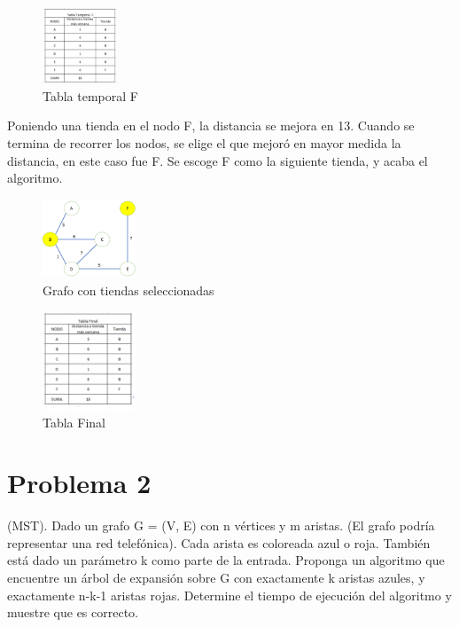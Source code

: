 \documentclass[conference,compsoc]{IEEEtran}
\begin{document}
\begin{figure}[h]
    \centering
    \includegraphics[width=0.20\textwidth]{Problema1/p14.png}
    \caption{Tabla temporal F}
    \label{fig:mesh1}
\end{figure}
$$$$
Poniendo una tienda en el nodo F, la distancia se mejora en 13.
Cuando se termina de recorrer los nodos, se elige el que mejoró en mayor medida la distancia, en este caso fue F.
Se escoge F como la siguiente tienda, y acaba el algoritmo.

\begin{figure}[h]
    \centering
    \includegraphics[width=0.25\textwidth]{Problema1/p15.png}
    \caption{Grafo con tiendas seleccionadas}
    \label{fig:mesh1}
\end{figure}
\begin{figure}[h]
    \centering
    \includegraphics[width=0.25\textwidth]{Problema1/p16.png}
    \caption{Tabla Final}
    \label{fig:mesh1}
\end{figure}


\section{Problema 2}
(MST). Dado un grafo G = (V, E) con n vértices y m aristas. (El grafo podría representar una red telefónica). Cada arista es coloreada azul o roja. También está dado un parámetro k como parte de la entrada. Proponga un algoritmo que encuentre un árbol de expansión sobre G con exactamente k aristas azules, y exactamente n-k-1 aristas rojas. Determine el tiempo de ejecución del algoritmo y muestre que es correcto.
\end{document}
